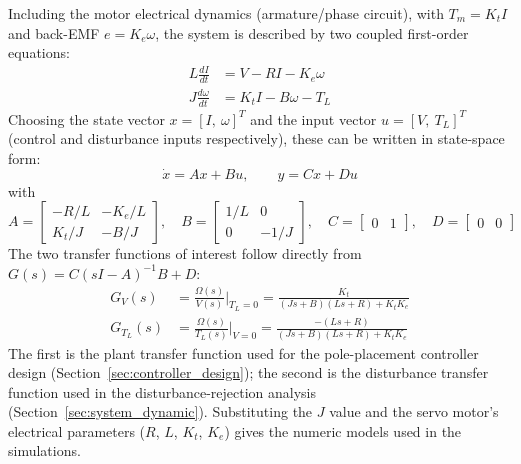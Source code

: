 \documentclass[12pt,a4paper]{report}
\begin{document}
	Including the motor electrical dynamics (armature/phase circuit), with $T_m = K_t I$ and
	back-EMF $e = K_e\omega$, the system is described by two coupled first-order equations:
	\begin{align}
		L\frac{dI}{dt} &= V - RI - K_e\omega \\
		J\frac{d\omega}{dt} &= K_t I - B\omega - T_L
	\end{align}
	Choosing the state vector $x = [I,\ \omega]^T$ and the input vector $u = [V,\ T_L]^T$
	(control and disturbance inputs respectively), these can be written in state-space form:
	\begin{equation}
		\dot{x} = Ax + Bu, \qquad y = Cx + Du
	\end{equation}
	with
	\begin{equation}
		A = \begin{bmatrix} -R/L & -K_e/L \\[2pt] K_t/J & -B/J \end{bmatrix}, \quad
		B = \begin{bmatrix} 1/L & 0 \\[2pt] 0 & -1/J \end{bmatrix}, \quad
		C = \begin{bmatrix} 0 & 1 \end{bmatrix}, \quad
		D = \begin{bmatrix} 0 & 0 \end{bmatrix}
	\end{equation}
	The two transfer functions of interest follow directly from
	$G(s) = C(sI - A)^{-1}B + D$:
	\begin{align}
		G_V(s) &= \frac{\Omega(s)}{V(s)}\bigg|_{T_L=0} = \frac{K_t}{(Js+B)(Ls+R) + K_t K_e} \\
		G_{T_L}(s) &= \frac{\Omega(s)}{T_L(s)}\bigg|_{V=0} = \frac{-(Ls+R)}{(Js+B)(Ls+R) + K_t K_e}
	\end{align}
	The first is the plant transfer function used for the pole-placement controller design
	(Section~\ref{sec:controller_design}); the second is the disturbance transfer function used
	in the disturbance-rejection analysis (Section~\ref{sec:system_dynamic}). Substituting the $J$ value and the servo motor's electrical parameters ($R$, $L$, $K_t$,
	$K_e$) gives the numeric models used in the simulations.

	
\end{document}
